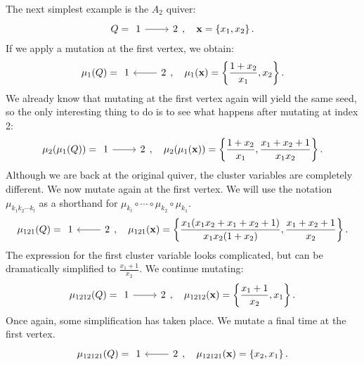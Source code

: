 \begin{example}\label{exmp:A2_quiver}
	The next simplest example is the $A_2$ quiver:
	\begin{equation*}
		Q = \begin{tikzcd}
			1 \rar &2
		\end{tikzcd},
		\quad \bx = \left\{x_1, x_2\right\}.
	\end{equation*}
	If we apply a mutation at the first vertex, we obtain:
	\begin{equation*}
		\mu_1(Q) = \begin{tikzcd}
			1 & \lar 2
		\end{tikzcd},
		\quad \mu_1(\bx) = \left\{\frac{1+x_2}{x_1}, x_2\right\}.
	\end{equation*}
	We already know that mutating at the first vertex again will yield the same seed, so
	the only interesting thing to do is to see what happens after mutating at index 2:
	\begin{equation*}
		\mu_2(\mu_1(Q)) = \begin{tikzcd}
			1 \rar & 2
		\end{tikzcd},
		\quad  \mu_2(\mu_1(\bx)) = \left\{\frac{1+x_2}{x_1}, \frac{x_1 + x_2 + 1}{x_1 x_2}\right\}.
	\end{equation*}
	Although we are back at the original quiver, the cluster variables are completely
	different. We now mutate again at the first vertex. We will use the notation
	$\mu_{k_1k_2\cdots k_l}$ as a shorthand for $\mu_{k_l} \circ \cdots \circ \mu_{k_2}
		\circ \mu_{k_1}$.
	\begin{equation*}
		\mu_{121}(Q) = \begin{tikzcd}
			1 &\lar 2
		\end{tikzcd},
		\quad  \mu_{121}(\bx) = \left\{\frac{x_1(x_1 x_2 + x_1 + x_2 + 1)}{x_1x_2(1+x_2)}, \frac{x_1 + x_2 + 1}{x_2}\right\}.
	\end{equation*}
	The expression for the first cluster variable looks complicated, but can be
	dramatically simplified to $\frac{x_1 + 1}{x_2}$. We continue mutating:
	\begin{equation*}
		\mu_{1212}(Q) = \begin{tikzcd}
			1 \rar& 2
		\end{tikzcd},
		\quad  \mu_{1212}(\bx) = \left\{\frac{x_1 + 1}{x_2}, x_1\right\}.
	\end{equation*}
	Once again, some simplification has taken place. We mutate a final time at the first
	vertex.
	\begin{equation*}
		\mu_{12121}(Q) = \begin{tikzcd}
			1 &\lar 2
		\end{tikzcd},
		\quad  \mu_{12121}(\bx) = \left\{x_2, x_1\right\}.
	\end{equation*}


\end{example}
